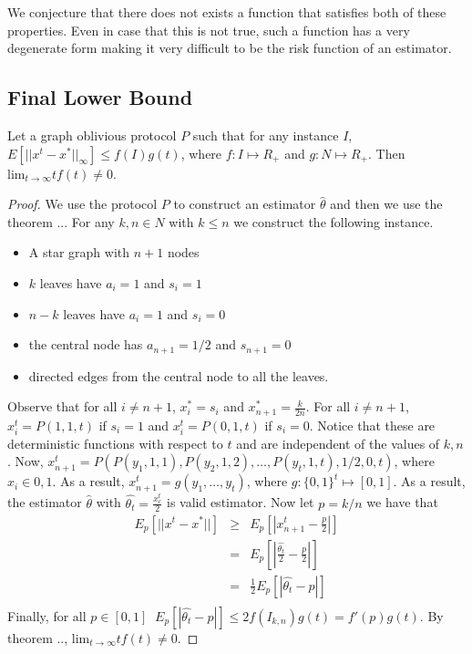 We conjecture that there does not exists a function that satisfies both of these properties. Even in case that this is not true, such a function has a very degenerate form making it very difficult to be the risk function of an estimator.  

\subsection{Final Lower Bound}
\begin{theorem}
Let a graph oblivious protocol $P$ such that for any instance $I$, $E[||x^t - x^*||_{\infty}] \leq f(I)g(t)$, where $f: I\mapsto R_+$ and $g: N \mapsto R_+$. Then $\text{lim}_{t \to \infty}tf(t)\neq 0$.
\end{theorem}
\begin{proof}
We use the protocol $P$ to construct an estimator $\hat{\theta}$ and then we use the theorem ... For any $k,n \in N$ with $k \leq n$ we construct the following instance.
\begin{itemize}
 \item A star graph with $n+1$ nodes
 \item $k$ leaves have $a_i=1$ and $s_i=1$
 \item $n-k$ leaves have $a_i=1$ and $s_i=0$
 \item the central node has $a_{n+1}=1/2$ and $s_{n+1}=0$
\item directed edges from the central node to all the leaves.
 \end{itemize} Observe that for all $i \neq n+1$, $x^*_i=s_i$ and $x^*_{n+1}=\frac{k}{2n}$. For all $i\neq n+1$, $x_i^t=P(1,1,t)$ if $s_i=1$ and $x_i^t=P(0,1,t)$ if $s_i=0$. Notice that these are deterministic functions with respect to $t$ and are independent of the values of $k,n$. Now, $x_{n+1}^t=P(P(y_1,1,1),P(y_2,1,2),\dots,P(y_t,1,t),1/2,0,t)$, where $x_i \in {0,1}$. As a result, $x_{n+1}^t = g(y_1,\ldots,y_t)$, where $g: \{0,1\}^t \mapsto [0,1]$. As a result, the estimator $\hat{\theta}$ with $\hat{\theta_t} =\frac{x_c^t}{2}$ is valid estimator. Now let $p=k/n$ we have that \begin{eqnarray*}
  E_p[||x^t-x^*||] &\geq& E_p[|x_{n+1}^t-\frac{p}{2}|]\\
  &=& E_p[|\frac{\hat{\theta_t}}{2}-\frac{p}{2}|]\\
  &=& \frac{1}{2}E_p[|\hat{\theta_t}-p|]\\
 \end{eqnarray*} Finally, for all $p \in[0,1]~$  $E_p[|\hat{\theta_t}-p|] \leq 2f(I_{k,n})g(t)= f'(p)g(t)$. By theorem .., $\text{lim}_{t \to \infty}tf(t)\neq 0$.
 
 
 

 
 
\end{proof}
